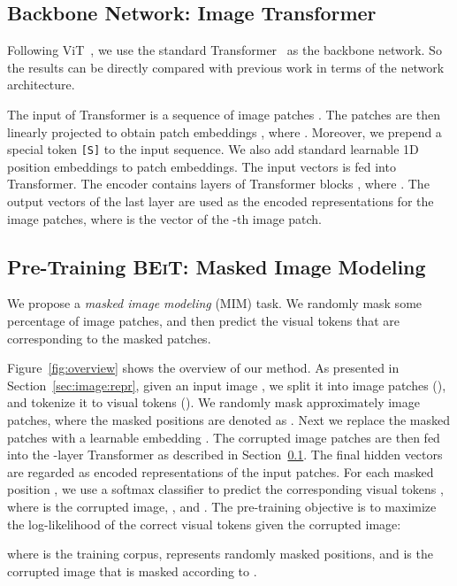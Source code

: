 \documentclass{article}
\newcommand{\sptk}[1]{\texttt{[#1]}}
\newcommand\our{\textsc{BEiT}}
\begin{document}
\subsection{Backbone Network: Image Transformer}
\label{sec:backbone}

Following ViT~\citep{vit}, we use the standard Transformer~\citep{transformer} as the backbone network.
So the results can be directly compared with previous work in terms of the network architecture.

The input of Transformer is a sequence of image patches .
The patches are then linearly projected to obtain patch embeddings , where .
Moreover, we prepend a special token \sptk{S} to the input sequence.
We also add standard learnable 1D position embeddings  to patch embeddings.
The input vectors  is fed into Transformer.
The encoder contains  layers of Transformer blocks , where .
The output vectors of the last layer  are used as the encoded representations for the image patches, where  is the vector of the -th image patch.

\subsection{Pre-Training \our{}: Masked Image Modeling}

We propose a \textit{masked image modeling} (MIM) task.
We randomly mask some percentage of image patches, and then predict the visual tokens that are corresponding to the masked patches.

Figure~\ref{fig:overview} shows the overview of our method.
As presented in Section~\ref{sec:image:repr}, given an input image , we split it into  image patches (), and tokenize it to  visual tokens ().
We randomly mask approximately  image patches, where the masked positions are denoted as .
Next we replace the masked patches with a learnable embedding .
The corrupted image patches  are then fed into the -layer Transformer as described in Section~\ref{sec:backbone}.
The final hidden vectors  are regarded as encoded representations of the input patches.
For each masked position , we use a softmax classifier to predict the corresponding visual tokens , where  is the corrupted image,  , and .
The pre-training objective is to maximize the log-likelihood of the correct visual tokens  given the corrupted image:

where  is the training corpus,  represents randomly masked positions, and  is the corrupted image that is masked according to .
\end{document}
